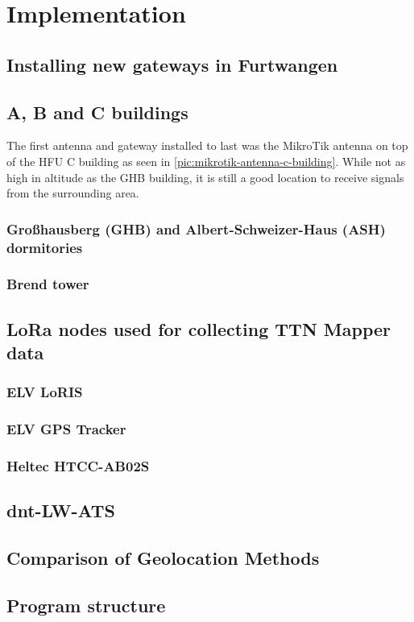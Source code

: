 \chapter{Implementation}

\section{Installing new gateways in Furtwangen}

\section{A, B and C buildings}

The first antenna and gateway installed to last was the MikroTik antenna on top of the \ac{HFU} C building as seen in \cref{pic:mikrotik-antenna-c-building}.
While not as high in altitude as the GHB building, it is still a good location to receive signals from the surrounding area.

\subsection{Großhausberg (GHB) and Albert-Schweizer-Haus (ASH) dormitories}

\subsection{Brend tower}

\section{\ac{LoRa} nodes used for collecting TTN Mapper data}

\subsection{ELV LoRIS}


\subsection{ELV GPS Tracker}

\subsection{Heltec HTCC-AB02S}

\section{dnt-LW-ATS}


\section{Comparison of Geolocation Methods}

\section{Program structure}